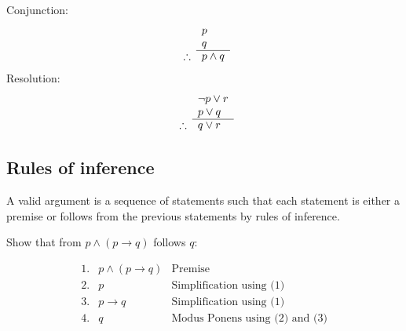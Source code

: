 Conjunction:
\begin{equation}
    \begin{array}{r l}
                   & p         \\
                   & q         \\
        \cline{2-2}
        \therefore & p \land q
    \end{array}
\end{equation}
Resolution:
\begin{equation}
    \begin{array}{r ll}
                   & \neg  p \lor r \\
                   & p \lor q       \\
        \cline{2-2}
        \therefore & q \lor r
    \end{array}
\end{equation}

\subsection{Rules of inference}
A valid argument is a sequence of statements such that each statement is either a premise or follows from the previous statements by rules of inference.

\begin{example}
    Show that from \(p \land (p \rightarrow q)\) follows \(q\):

    \begin{equation*}
        \begin{array}{rll}
            \text{1.} & p \land (p \rightarrow q) & \text{Premise}                        \\
            \text{2.} & p                         & \text{Simplification using (1)}       \\
            \text{3.} & p \rightarrow q           & \text{Simplification using (1)}       \\
            \text{4.} & q                         & \text{Modus Ponens using (2) and (3)}
        \end{array}
    \end{equation*}

\end{example}

